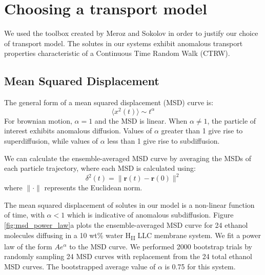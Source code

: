\documentclass{article}
\begin{document}
  \section{Choosing a transport model}\label{section:transport_model_selection}

  We used the toolbox created by Meroz and Sokolov in order to justify our
  choice of transport model.\cite{meroz_toolbox_2015} The solutes in our systems
  exhibit anomalous transport properties characteristic of a Continuous Time
  Random Walk (CTRW). 

  \subsection*{Mean Squared Displacement}

  The general form of a mean squared displacement (MSD) curve is:
  \begin{equation}
	\langle x^2(t) \rangle \sim t ^ \alpha
	\label{eqn:msd}
  \end{equation}
  For brownian motion, $\alpha = 1$ and the MSD is linear. When $\alpha \neq
  1$, the particle of interest exhibits anomalous diffusion. Values of $\alpha$
  greater than 1 give rise to superdiffusion, while values of $\alpha$ less than
  1 give rise to subdiffusion.

  We can calculate the ensemble-averaged MSD curve by averaging the MSDs of
  each particle trajectory, where each MSD is calculated using:
  \begin{equation}
	\delta^2(t) = \| \mathbf{r}(t) - \mathbf{r}(0) \|^2
	\label{eqn:ensemble_msd}
  \end{equation}
  where $\|\cdot\|$ represents the Euclidean norm. 

  The mean squared displacement of solutes in our model is a non-linear
  function of time, with $\alpha < 1$ which is indicative of anomalous
  subdiffusion. Figure \ref{fig:msd_power_law}a plots the ensemble-averaged MSD
  curve for 24 ethanol molecules diffusing in a 10 wt\% water H\textsubscript{II}
  LLC membrane system. We fit a power law of the form $Ae^{\alpha}$ to the MSD
  curve. We performed 2000 bootstrap trials by randomly sampling 24 MSD curves
  with replacement from the 24 total ethanol MSD curves. The bootstrapped average
  value of $\alpha$ is 0.75 for this system. 
 
\end{document}
